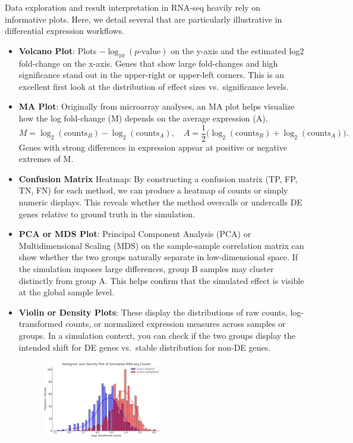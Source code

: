 \documentclass[12pt]{article}
\begin{document}
Data exploration and result interpretation in RNA-seq heavily rely on informative plots. Here, we detail several that are particularly illustrative in differential expression workflows.

\begin{itemize}
\item \textbf{Volcano Plot}: Plots $-\log_{10}(p\text{-value})$ on the y-axis and the estimated log2 fold-change on the x-axis. Genes that show large fold-changes and high significance stand out in the upper-right or upper-left corners. This is an excellent first look at the distribution of effect sizes vs.\ significance levels.

\item \textbf{MA Plot}: Originally from microarray analyses, an MA plot helps visualize how the log fold-change (M) depends on the average expression (A). 
\[
M = \log_2(\text{counts}_B) - \log_2(\text{counts}_A), \quad
A = \frac{1}{2}\big(\log_2(\text{counts}_B) + \log_2(\text{counts}_A)\big).
\]
Genes with strong differences in expression appear at positive or negative extremes of M.


\item \textbf{Confusion Matrix} Heatmap: By constructing a confusion matrix (TP, FP, TN, FN) for each method, we can produce a heatmap of counts or simply numeric displays. This reveals whether the method overcalls or undercalls DE genes relative to ground truth in the simulation.
\newline

\item \textbf{PCA or MDS Plot}: Principal Component Analysis (PCA) or Multidimensional Scaling (MDS) on the sample-sample correlation matrix can show whether the two groups naturally separate in low-dimensional space. If the simulation imposes large differences, group B samples may cluster distinctly from group A. This helps confirm that the simulated effect is visible at the global sample level.
\newline

\item \textbf{Violin or Density Plots}: These display the distributions of raw counts, log-transformed counts, or normalized expression measures across samples or groups. In a simulation context, you can check if the two groups display the intended shift for DE genes vs.\ stable distribution for non-DE genes.
\begin{figure}[h]
  \centering
  \includegraphics[width=0.5\textwidth]{figure/output.png}  %
\end{figure}



\end{itemize}
\end{document}
